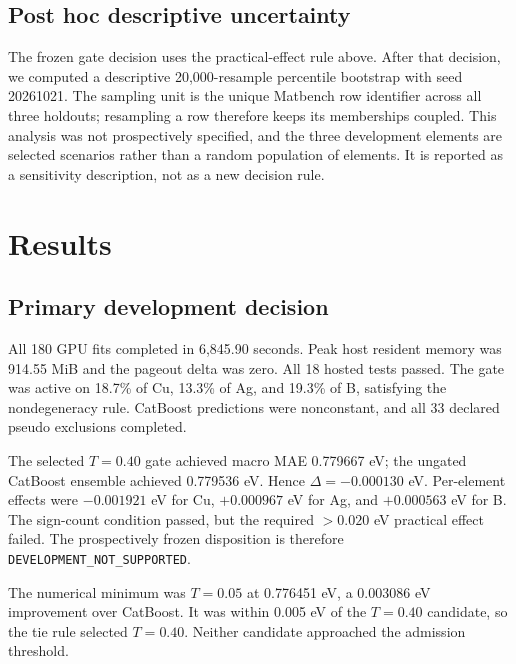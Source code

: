 \documentclass[11pt]{article}
\begin{document}
\subsection{Post hoc descriptive uncertainty}
The frozen gate decision uses the practical-effect rule above. After that
decision, we computed a descriptive 20,000-resample percentile bootstrap with
seed 20261021. The sampling unit is the unique Matbench row identifier across
all three holdouts; resampling a row therefore keeps its memberships coupled.
This analysis was not prospectively specified, and the three development
elements are selected scenarios rather than a random population of elements.
It is reported as a sensitivity description, not as a new decision rule.

\section{Results}
\subsection{Primary development decision}
All 180 GPU fits completed in 6,845.90 seconds. Peak host resident memory was
914.55 MiB and the pageout delta was zero. All 18 hosted tests passed. The gate
was active on 18.7\% of Cu, 13.3\% of Ag, and 19.3\% of B, satisfying the
nondegeneracy rule. CatBoost predictions were nonconstant, and all 33 declared
pseudo exclusions completed.

The selected $T=0.40$ gate achieved macro MAE 0.779667 eV; the ungated CatBoost
ensemble achieved 0.779536 eV. Hence $\Delta=-0.000130$ eV. Per-element effects
were $-0.001921$ eV for Cu, $+0.000967$ eV for Ag, and $+0.000563$ eV for B.
The sign-count condition passed, but the required $>0.020$ eV practical effect
failed. The prospectively frozen disposition is therefore
\texttt{DEVELOPMENT\_\allowbreak{}NOT\_\allowbreak{}SUPPORTED}.

The numerical minimum was $T=0.05$ at 0.776451 eV, a 0.003086 eV improvement
over CatBoost. It was within 0.005 eV of the $T=0.40$ candidate, so the tie rule
selected $T=0.40$. Neither candidate approached the admission threshold.

\begin{table}[t]
\centering
\caption{Development MAE (eV). Macro is the unweighted mean across elements.
The Extra Trees result is a secondary control; the frozen hypothesis concerns
the selected risk gate versus the identical CatBoost ensemble.}
\label{tab:development}
\resizebox{\linewidth}{!}{}
\end{table}
\end{document}
